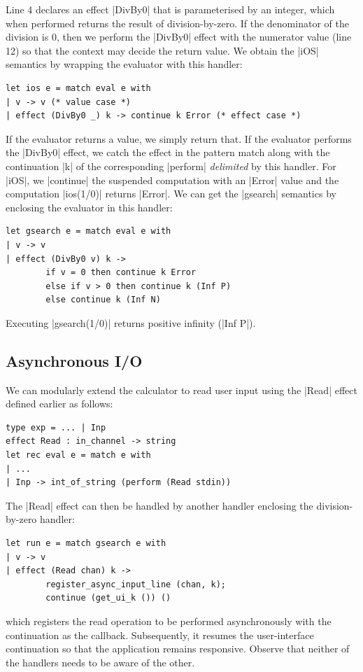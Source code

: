 \documentclass[sigplan,10pt,review,anonymous]{acmart}\settopmatter{printfolios=true,printccs=false,printacmref=false}
\begin{document}
Line 4 declares an effect |DivBy0| that is parameterised by an integer, which
when performed returns the result of division-by-zero. If the denominator of
the division is 0, then we perform the |DivBy0| effect with the numerator value
(line 12) so that the context may decide the return value. We obtain the |iOS|
semantics by wrapping the evaluator with this handler:
\begin{lstlisting}
let ios e = match eval e with
| v -> v (* value case *)
| effect (DivBy0 _) k -> continue k Error (* effect case *)
\end{lstlisting}
If the evaluator returns a value, we simply return that. If the evaluator
performs the |DivBy0| effect, we catch the effect in the pattern match along with
the continuation |k| of the corresponding |perform| \emph{delimited} by this
handler. For |iOS|, we |continue| the suspended computation with an
|Error| value and the computation |ios(1/0)| returns |Error|.
We can get the |gsearch| semantics by enclosing the evaluator in this handler:
\begin{lstlisting}
let gsearch e = match eval e with
| v -> v
| effect (DivBy0 v) k ->
		if v = 0 then continue k Error
		else if v > 0 then continue k (Inf P)
		else continue k (Inf N)
\end{lstlisting}
Executing |gsearch(1/0)| returns positive infinity (|Inf P|).

\subsection{Asynchronous I/O}
\label{sec:aio}

We can modularly extend the calculator to read user input using the |Read|
effect defined earlier as follows:
\begin{lstlisting}
type exp = ... | Inp
effect Read : in_channel -> string
let rec eval e = match e with
| ...
| Inp -> int_of_string (perform (Read stdin))
\end{lstlisting}
The |Read| effect can then be handled by another handler enclosing the
division-by-zero handler:
\begin{lstlisting}
let run e = match gsearch e with
| v -> v
| effect (Read chan) k ->
		register_async_input_line (chan, k);
		continue (get_ui_k ()) ()
\end{lstlisting}
\noindent which registers the read operation to be performed asynchronously
with the continuation as the callback. Subsequently, it resumes the
user-interface continuation so that the application remains responsive. Observe
that neither of the handlers needs to be aware of the other.
\end{document}
